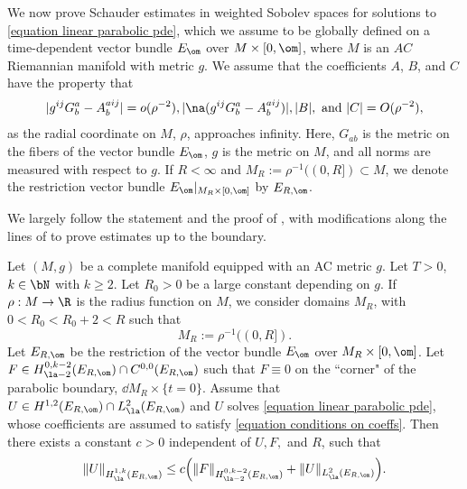 \documentclass[hidelinks, 12pt, oneside, reqno]{amsart}
\begin{document}
We now prove Schauder estimates in weighted Sobolev spaces for solutions to \eqref{equation linear parabolic pde}, which we assume to be globally defined on a time-dependent vector bundle $E_{\om}$ over $M \times [0,\om]$, where $M$ is an $AC$ Riemannian manifold with metric $g$. We assume that the coefficients $A$, $B$, and $C$ have the property that
\begin{equation}\label{equation conditions on coeffs}
|g^{ij}G^a_b - A^{aij}_b| = o(\rho^{-2}), |\na (g^{ij}G^a_b - A^{aij}_b)|, |B|, \text{ and } |C| = O(\rho^{-2}),
\end{equation}
as the radial coordinate on $M$, $\rho$, approaches infinity. Here, $G_{ab}$ is the metric on the fibers of the vector bundle $E_\om$, $g$ is the metric on $M$, and all norms are measured with respect to $g$. If $R < \infty$ and $M_R := \rho^{-1}((0,R]) \subset M$, we denote the restriction vector bundle $E_{\om}|_{M_R \times [0,\om]}$ by $E_{R,\om}$.

We largely follow the statement and the proof of \cite[Propositions 7.3-7.4]{LMCFwithsings}, with modifications along the lines of \cite[\S 7]{SchlagSchauder} to prove estimates up to the boundary. 


\begin{prop}\label{proposition weighted schauder estimates}
    Let $(M, g)$ be a complete manifold equipped with an AC metric $g$. Let $T>0$, $k \in \bN$ with $k \ge 2$. Let $R_0 > 0$ be a large constant depending on $g$. If $\rho: M \rightarrow \R$ is the radius function on $M$, we consider domains $M_R$, with $0 < R_0 < R_0 + 2 < R$ such that 
    \[
    M_R := \rho^{-1}((0,R]). 
    \]
   Let $E_{R,\om}$ be the restriction of the vector bundle $E_\om$ over $M_R \times [0,\om]$. Let $F \in H^{0,k-2}_{\la -2}(E_{R,\om}) \cap C^{0,0}(E_{R,\om})$ such that $F \equiv 0$ on the ``corner" of the parabolic boundary, $\dd M_R  \times \{t= 0\}$.  Assume that $U \in H^{1,2}(E_{R,\om}) \cap  L^2_{\la}(E_{R,\om})$ and $U$ solves \eqref{equation linear parabolic pde}, whose coefficients are assumed to satisfy \eqref{equation conditions on coeffs}. Then there exists a constant $c >0$ independent of $U, F,$ and $R$, such that
    \begin{equation}\label{equation schauder estimates vb with boundary}
        \|U\|_{H^{1,k}_{\la}(E_{R,\om})} \le c\Big(\|F\|_{H^{0,k-2}_{\la-2}(E_{R,\om})} + \|U\|_{L^2_{\la}(E_{R,\om})} \Big).
    \end{equation}
\end{prop}
\end{document}

